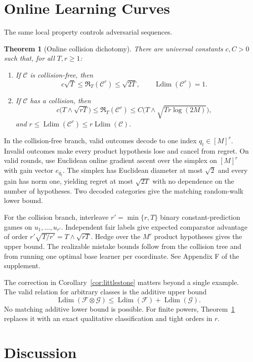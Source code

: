 \documentclass[twoside]{article}
\newtheorem{theorem}{Theorem}
\newcommand{\C}{\mathcal C}
\newcommand{\Ldim}{\operatorname{Ldim}}
\newcommand{\Risk}{\mathfrak R}
\begin{document}
\section{Online Learning Curves}
\label{sec:online}

The same local property controls adversarial sequences.

\begin{theorem}[Online collision dichotomy]
\label{thm:online}
There are universal constants $c,C>0$ such that, for all $T,r\geq1$:
\begin{enumerate}
\item If $\C$ is collision-free, then
\[ c\sqrt T\leq\Risk_T(\C^r)\leq\sqrt{2T}, \qquad \Ldim(\C^r)=1. \]
\item If $\C$ has a collision, then
\[ c\bigl(T\wedge\sqrt{rT}\bigr) \leq\Risk_T(\C^r) \leq C\bigl(T\wedge\sqrt{Tr\log(2M)}\bigr), \] and $r\leq\Ldim(\C^r)\leq r\Ldim(\C)$.
\end{enumerate}
\end{theorem}

In the collision-free branch, valid outcomes decode to one index $q_t\in[M]^r$. Invalid outcomes make every product hypothesis lose and cancel from regret. On valid rounds, use Euclidean online gradient ascent over the simplex on $[M]^r$ with gain vector $e_{q_t}$. The simplex has Euclidean diameter at most $\sqrt2$ and every gain has norm one, yielding regret at most $\sqrt{2T}$ with no dependence on the number of hypotheses. Two decoded categories give the matching random-walk lower bound.

For the collision branch, interleave $r'=\min\{r,T\}$ binary constant-prediction games on $u_1,\ldots,u_{r'}$. Independent fair labels give expected comparator advantage of order $r'\sqrt{T/r'}=T\wedge\sqrt{rT}$. Hedge over the $M^r$ product hypotheses gives the upper bound. The realizable mistake bounds follow from the collision tree and from running one optimal base learner per coordinate. See Appendix F of the supplement.

The correction in Corollary~\ref{cor:littlestone} matters beyond a single example. The valid relation for arbitrary classes is the additive upper bound \[ \Ldim(\mathcal F\otimes\mathcal G)\leq\Ldim(\mathcal F)+\Ldim(\mathcal G). \] No matching additive lower bound is possible. For finite powers, Theorem~\ref{thm:online} replaces it with an exact qualitative classification and tight orders in $r$.

\section{Discussion}
\end{document}

